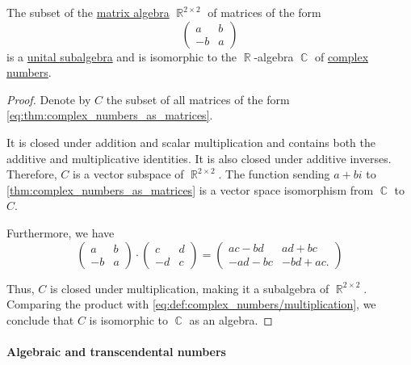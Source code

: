 \begin{proposition}\label{thm:complex_numbers_as_matrices}
  The subset of the \hyperref[thm:matrix_algebra]{matrix algebra} \( \BbbR^{2 \times 2} \) of matrices of the form
  \begin{equation}\label{eq:thm:complex_numbers_as_matrices}
    \begin{pmatrix}
      a  & b \\
      -b & a
    \end{pmatrix}
  \end{equation}
  is a \hyperref[def:algebra_over_ring/subobject]{unital subalgebra} and is isomorphic to the \( \BbbR \)-algebra \( \BbbC \) of \hyperref[def:complex_numbers]{complex numbers}.
\end{proposition}
\begin{proof}
  Denote by \( C \) the subset of all matrices of the form \eqref{eq:thm:complex_numbers_as_matrices}.

  It is closed under addition and scalar multiplication and contains both the additive and multiplicative identities. It is also closed under additive inverses. Therefore, \( C \) is a vector subspace of \( \BbbR^{2 \times 2} \). The function sending \( a + bi \) to \eqref{thm:complex_numbers_as_matrices} is a vector space isomorphism from \( \BbbC \) to \( C \).

  Furthermore, we have
  \begin{equation*}
    \begin{pmatrix}
      a  & b \\
      -b & a
    \end{pmatrix}
    \cdot
    \begin{pmatrix}
      c  & d \\
      -d & c
    \end{pmatrix}
    =
    \begin{pmatrix}
      ac - bd  & ad + bc \\
      -ad - bc & -bd + ac.
    \end{pmatrix}
  \end{equation*}

  Thus, \( C \) is closed under multiplication, making it a subalgebra of \( \BbbR^{2 \times 2} \). Comparing the product with \eqref{eq:def:complex_numbers/multiplication}, we conclude that \( C \) is isomorphic to \( \BbbC \) as an algebra.
\end{proof}

\paragraph{Algebraic and transcendental numbers}

